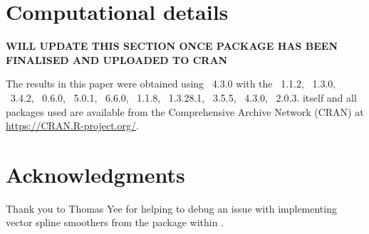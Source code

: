 \documentclass[article,shortnames]{jss}
\begin{document}

\section*{Computational details}

\textbf{WILL UPDATE THIS SECTION ONCE PACKAGE HAS BEEN FINALISED AND UPLOADED TO CRAN}

The results in this paper were obtained using
~4.3.0 with the
~1.1.2,
~1.3.0,
~3.4.2,
~0.6.0,
~5.0.1,
~6.6.0,
~1.1.8,
~1.3.28.1,
~3.5.5,
~4.3.0,
~2.0.3.  itself
and all packages used are available from the Comprehensive
 Archive Network (CRAN) at
\url{https://CRAN.R-project.org/}.

\section*{Acknowledgments}

\begin{leftbar}
Thank you to Thomas Yee for helping to debug an issue with implementing vector spline smoothers from the  package within .
\end{leftbar}



\end{document}
